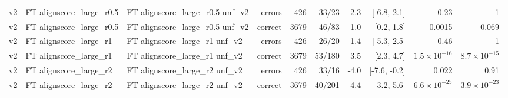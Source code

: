 \begin{scriptsize}
\begin{longtable}{lllrrrrrrr}
v2 & FT alignscore\_large\_r0.5 & FT alignscore\_large\_r0.5 unf\_v2 & errors & 426 & 33/23 & -2.3 & [-6.8, 2.1] & 0.23 & 1 \\
v2 & FT alignscore\_large\_r0.5 & FT alignscore\_large\_r0.5 unf\_v2 & correct & 3679 & 46/83 & 1.0 & [0.2, 1.8] & 0.0015 & 0.069 \\
v2 & FT alignscore\_large\_r1 & FT alignscore\_large\_r1 unf\_v2 & errors & 426 & 26/20 & -1.4 & [-5.3, 2.5] & 0.46 & 1 \\
v2 & FT alignscore\_large\_r1 & FT alignscore\_large\_r1 unf\_v2 & correct & 3679 & 53/180 & 3.5 & [2.3, 4.7] & $1.5\times10^{-16}$ & $8.7\times10^{-15}$ \\
v2 & FT alignscore\_large\_r2 & FT alignscore\_large\_r2 unf\_v2 & errors & 426 & 33/16 & -4.0 & [-7.6, -0.2] & 0.022 & 0.91 \\
v2 & FT alignscore\_large\_r2 & FT alignscore\_large\_r2 unf\_v2 & correct & 3679 & 40/201 & 4.4 & [3.2, 5.6] & $6.6\times10^{-25}$ & $3.9\times10^{-23}$ \\
\end{longtable}
\end{scriptsize}
